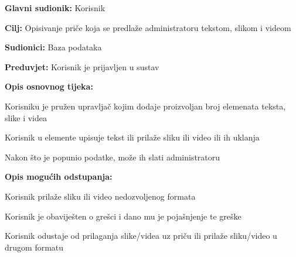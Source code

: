 					\noindent {}
				\begin{packed_item}
					
					\item \textbf{Glavni sudionik: }Korisnik
					\item  \textbf{Cilj:} Opisivanje priče koja se predlaže administratoru tekstom, slikom i videom
					\item  \textbf{Sudionici:} Baza podataka
					\item  \textbf{Preduvjet:} Korisnik je prijavljen u sustav
					\item  \textbf{Opis osnovnog tijeka:}
					
					\item[] \begin{packed_enum}
						
						\item Korisniku je pružen upravljač kojim dodaje proizvoljan broj elemenata teksta, slike i videa 
						\item Korisnik u elemente upisuje tekst ili prilaže sliku ili video ili ih uklanja
						\item Nakon što je popunio podatke, može ih slati administratoru
					\end{packed_enum}
					
					\item  \textbf{Opis mogućih odstupanja:}
					
					\item[] \begin{packed_item}
						
						\item[2.a] Korisnik prilaže sliku ili video nedozvoljenog formata
						\item[] \begin{packed_enum}
							
							\item Korisnik je obaviješten o grešci i dano mu je pojašnjenje te greške
							\item Korisnik odustaje od prilaganja slike/videa uz priču ili prilaže sliku/video u drugom formatu
							
						\end{packed_enum}	
					\end{packed_item}
				\end{packed_item}
			
